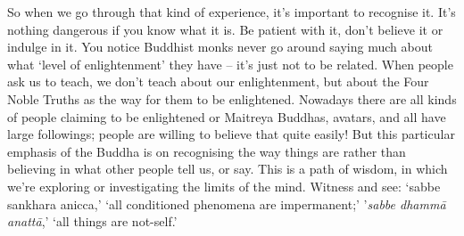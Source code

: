 So when we go through that kind of experience, it's important to recognise it. It's nothing dangerous if you know what it is. Be patient with it, don't believe it or indulge in it. You notice Buddhist monks never go around saying much about what `level of enlightenment' they have -- it's just not to be related. When people ask us to teach, we don't teach about our enlightenment, but about the Four Noble Truths as the way for them to be enlightened. Nowadays there are all kinds of people claiming to be enlightened or Maitreya Buddhas, avatars, and all have large followings; people are willing to believe that quite easily! But this particular emphasis of the Buddha is on recognising the way things are rather than believing in what other people tell us, or say. This is a path of wisdom, in which we're exploring or investigating the limits of the mind. Witness and see: `sabbe sankhara anicca,' `all conditioned phenomena are impermanent;' '\textit{sabbe dhamm\=a anatt\=a},' `all things are not-self.' 


